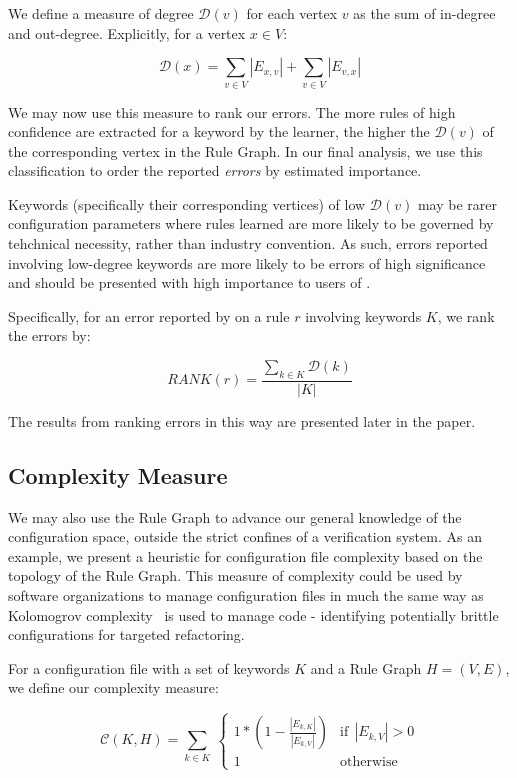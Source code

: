 We define a measure of degree $\mathcal{D}(v)$ for each vertex $v$ as the sum of 
in-degree and out-degree. Explicitly, for a vertex $x \in V$:

    $$\mathcal{D}(x) = \sum_{v \in V} |E_{x, v}| + \sum_{v \in V} |E_{v, x}|$$

We may now use this measure to rank our errors.
The more rules of high confidence are extracted for a keyword by the learner, 
the higher the $\mathcal{D}(v)$ of the corresponding vertex in the Rule Graph.
In our final analysis, we use this classification to
order the reported {\it errors} by estimated importance.

Keywords (specifically their corresponding vertices)
of low $\mathcal{D}(v)$ may be rarer configuration
parameters where rules learned are more likely to be governed by 
tehchnical necessity, rather than industry convention. As such, errors
reported involving low-degree keywords are more likely to be errors
of high significance and should be presented with high importance
to users of \app.

Specifically, for an error reported by \app on a rule $r$ involving
keywords $K$, we rank the errors by:

    $$RANK(r) = \frac{\sum_{k \in K} \mathcal{D}(k)}{|K|}$$

The results from ranking errors in this way are presented later in
the paper.

\subsection{Complexity Measure}

We may also use the Rule Graph to advance our general knowledge
of the configuration space, outside the strict confines of a
verification system. As an example, we present a heuristic
for configuration file complexity based on the topology of the
Rule Graph. This measure of complexity could be used by software
organizations to manage configuration files in much the same way
as Kolomogrov complexity~\cite{kolomogrov} is used to manage code - identifying
potentially brittle configurations for targeted refactoring.


For a configuration file with a set of keywords $K$
and a Rule Graph $H = (V, E)$, we define our complexity measure:

\begin{equation}
    \mathcal{C}(K, H) = \sum_{k \in K} \
        \begin{cases}
            1 * (1 - \frac{|E_{k, K}|}{|E_{k, V}|}) & \text{if}\ \ |E_{k, V}| > 0 \\
            1 & \text{otherwise}
        \end{cases}
\end{equation}

